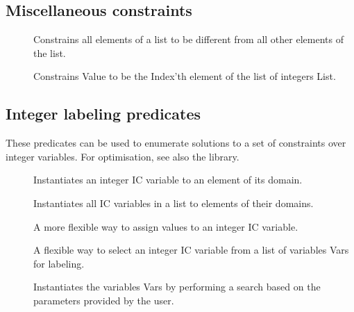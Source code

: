 \subsection{Miscellaneous constraints}

\begin{description}

\item
[]
Constrains all elements of a list to be different from all other
elements of the list.

\item
[]
Constrains Value to be the Index'th element of the list of integers List.

\end{description}


\subsection{Integer labeling predicates}

These predicates can be used to enumerate solutions to a set of constraints
over integer variables.  For optimisation, see also the
 library.

\begin{description}

\item []
Instantiates an integer IC variable to an element of its domain.

\item []
Instantiates all IC variables in a list to elements of their domains.

\item  []
A more flexible way to assign values to an integer IC variable.
\item  []
A flexible way to select an integer IC variable from a list of variables Vars
for labeling. 
\item []
Instantiates the variables Vars by performing a search based on the
parameters provided by the user.

\end{description}


